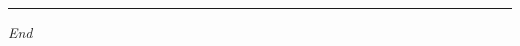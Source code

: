   \mbox{}\hfill
  \begin{minipage}{.25\textwidth}
   \hrule

   \hfill\itshape End\\\mbox{}\hfill\mbox{}

  \end{minipage}

